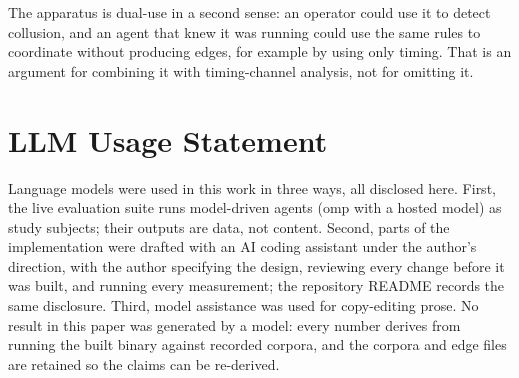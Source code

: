 \documentclass[11pt]{article}
\begin{document}
The apparatus is dual-use in a second sense: an operator could use it to detect
collusion, and an agent that knew it was running could use the same rules to
coordinate without producing edges, for example by using only timing. That is an
argument for combining it with timing-channel analysis, not for omitting it.

\section{LLM Usage Statement}

Language models were used in this work in three ways, all disclosed here. First,
the live evaluation suite runs model-driven agents (omp with a hosted model) as
study subjects; their outputs are data, not content. Second, parts of the
implementation were drafted with an AI coding assistant under the author's
direction, with the author specifying the design, reviewing every change before it
was built, and running every measurement; the repository README records the same
disclosure. Third, model assistance was used for copy-editing prose. No result in
this paper was generated by a model: every number derives from running the built
binary against recorded corpora, and the corpora and edge files are retained so
the claims can be re-derived.
\end{document}
